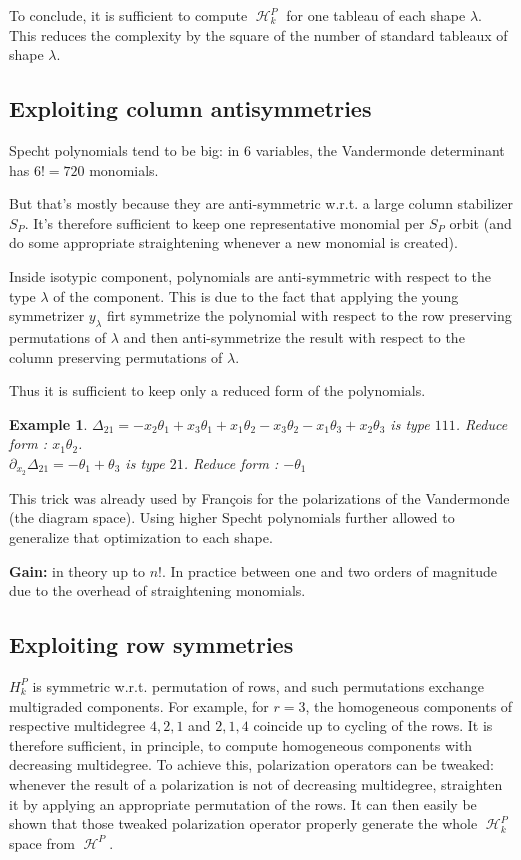 \documentclass[letter,12pt]{article}
\DeclareMathOperator{\harmonics}{\mathcal{H}}
\newtheorem{example}{Example}
\begin{document}
	To conclude, it is sufficient to compute $\harmonics_k^P$ for one tableau of each shape $\lambda$. This reduces the complexity by the square of the number of standard tableaux of shape $\lambda$.
	
	\subsection{Exploiting column antisymmetries}
	
	Specht polynomials tend to be big: in $6$ variables, the Vandermonde determinant has $6!=720$ monomials.
	
	But that's mostly because they are anti-symmetric w.r.t. a large column stabilizer $S_P$. It's therefore sufficient to keep one representative monomial per $S_P$ orbit (and do some appropriate straightening whenever a new monomial is created). 
	
	Inside isotypic component, polynomials are anti-symmetric with respect to the type $\lambda$ of the component. This is due to the fact that applying the young symmetrizer $y_{\lambda}$ firt symmetrize the polynomial with respect to the row preserving permutations of $\lambda$ and then anti-symmetrize the result with respect to the column preserving permutations of $\lambda$.
	
	Thus it is sufficient to keep only a reduced form of the polynomials. 
	
	\begin{example}
		$\Delta_{21} = -x_{2} \theta_{1} + x_{3} \theta_{1} + x_{1} \theta_{2} - x_{3} \theta_{2} - x_{1} \theta_{3} + x_{2} \theta_{3}$ is type $111$.
		Reduce form : $x_1\theta_2$. \\
		$\partial_{x_2}\Delta_{21} = -\theta_1 + \theta_3$ is type $21$. 
		Reduce form : $-\theta_1$ 
	\end{example} 
	
	This trick was already used by François for the polarizations of the Vandermonde (the diagram space). Using higher Specht polynomials further allowed  to generalize that optimization to each shape.
	
	\textbf{Gain:} in theory up to $n!$. In practice between one and two orders of magnitude due to the overhead of straightening monomials.
	
	\subsection{Exploiting row symmetries}
	
	$H_k^P$ is symmetric w.r.t. permutation of rows, and such permutations
	exchange multigraded components. For example, for $r=3$, the homogeneous components of respective multidegree $4,2,1$ and $2,1,4$ coincide
	up to cycling of the rows. It is therefore sufficient, in principle, to compute homogeneous components with decreasing multidegree.
	To achieve this, polarization operators can be tweaked: whenever the result of a polarization is not of decreasing multidegree, straighten it by applying an appropriate permutation of the rows. It can then easily be shown that those tweaked polarization operator properly generate the whole $\harmonics_k^P$ space from $\harmonics^P$.
	
\end{document}
